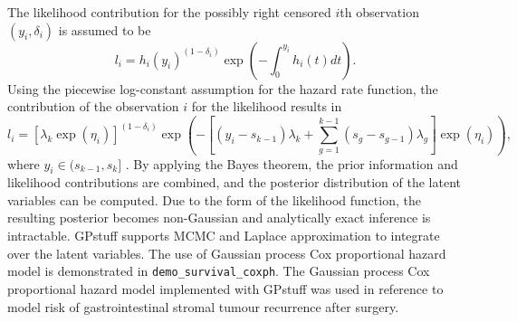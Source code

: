 \documentclass[twoside,11pt]{article}
\newcommand{\pkg}[1]{{\fontseries{b}\selectfont #1}}
\newcommand{\code}[1]{{\normalfont\texttt{#1}}}
\begin{document}
The likelihood contribution for the possibly right censored $i$th
observation $(y_i,\delta_i)$ is assumed to be
\begin{equation}
l_i=h_i(y_i)^{(1-\delta_i)} \exp \left(
  -\int_0^{y_i}h_i(t)dt \right).
\end{equation}
Using the piecewise log-constant assumption for the hazard rate
function, the contribution of the observation $i$ for the likelihood
results in
\begin{equation}
l_i=[\lambda_k \exp(\eta_i)]^{(1-\delta_i)}\exp \left( -[(y_i-s_{k-1})\lambda_k
  + \sum_{g=1}^{k-1}(s_g-s_{g-1})\lambda_g ]\exp(\eta_i) \right),
\end{equation}
where $y_i\in(s_{k-1},s_k]$
\citep{Ibrahim+Chen+Sinha:2001,Martino:2011}. By applying the Bayes
theorem, the prior information and likelihood contributions are
combined, and the posterior distribution of the latent variables can
be computed. Due to the form of the likelihood function, the resulting
posterior becomes non-Gaussian and analytically exact inference is
intractable. \pkg{GPstuff} supports MCMC and Laplace approximation to
integrate over the latent variables. The use of Gaussian process Cox
proportional hazard model is demonstrated in
\code{demo\_survival\_coxph}. The Gaussian process Cox proportional
hazard model implemented with GPstuff was used in reference
\citep{Joensuu+etal:2012a} to model risk of gastrointestinal stromal
tumour recurrence after surgery.

%    
%
%    
%
%
%
%
%
\end{document}
